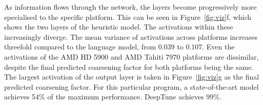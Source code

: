 As information flows through the network, the layers become progressively more specialised to the specific platform. This can be seen in Figure~\ref{fig:viz}f, which shows the two layers of the heuristic model. The activations within these increasingly diverge. The mean variance of activations across platforms increases threefold compared to the language model, from 0.039 to 0.107. Even the activations of the AMD HD 5900 and AMD Tahiti 7970 platforms are dissimilar, despite the final predicted coarsening factor for both platforms being the same. The largest activation of the output layer is taken in Figure~\ref{fig:viz}g as the final predicted coarsening factor. For this particular program, a state-of-the-art model achieves 54\% of the maximum performance. DeepTune achieves 99\%.
